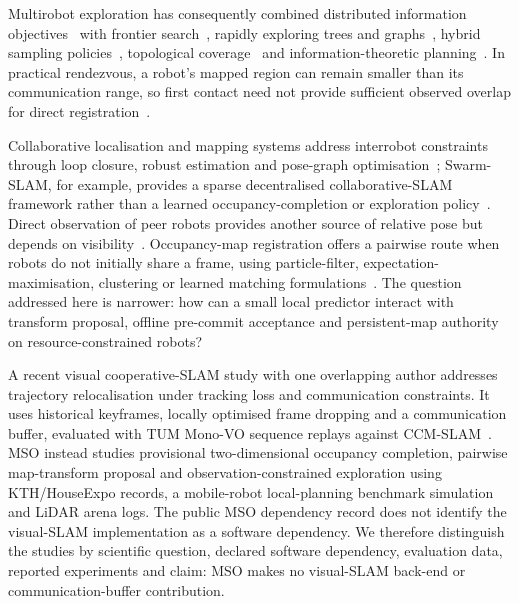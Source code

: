 \documentclass[11pt]{article}
\begin{document}
Multirobot exploration has consequently combined distributed information objectives~\citep{mu2016information,wang2025multi} with frontier search~\citep{holz2010evaluating,dornhege2013frontier}, rapidly exploring trees and graphs~\citep{lavalle1998rapidly,karaman2011sampling}, hybrid sampling policies~\citep{selin2019efficient,respall2021fast}, topological coverage~\citep{choset2000sensor,acar2002sensor} and information-theoretic planning~\citep{bourgault2002information,stachniss2005information}. In practical rendezvous, a robot's mapped region can remain smaller than its communication range, so first contact need not provide sufficient observed overlap for direct registration~\citep{zhou2006multi,thrun2005multi,birk2006merging,stathoulopoulos2023frame}.

Collaborative localisation and mapping systems address interrobot constraints through loop closure, robust estimation and pose-graph optimisation~\citep{lajoie2020door,schmuck2019ccm,lajoie2024swarm}; Swarm-SLAM, for example, provides a sparse decentralised collaborative-SLAM framework rather than a learned occupancy-completion or exploration policy~\citep{lajoie2024swarm}. Direct observation of peer robots provides another source of relative pose but depends on visibility~\citep{wang2024transformloc,zhu2024swarm,zhou2022swarm}. Occupancy-map registration offers a pairwise route when robots do not initially share a frame, using particle-filter, expectation-maximisation, clustering or learned matching formulations~\citep{carlone2011simultaneous,huang2024multi,dong2015distributed,saeedi2011multiple,saeedi2011neural}. The question addressed here is narrower: how can a small local predictor interact with transform proposal, offline pre-commit acceptance and persistent-map authority on resource-constrained robots?

A recent visual cooperative-SLAM study with one overlapping author addresses trajectory relocalisation under tracking loss and communication constraints. It uses historical keyframes, locally optimised frame dropping and a communication buffer, evaluated with TUM Mono-VO sequence replays against CCM-SLAM~\citep{chen2026accurate}. MSO instead studies provisional two-dimensional occupancy completion, pairwise map-transform proposal and observation-constrained exploration using KTH/HouseExpo records, a mobile-robot local-planning benchmark simulation and LiDAR arena logs. The public MSO dependency record does not identify the visual-SLAM implementation as a software dependency. We therefore distinguish the studies by scientific question, declared software dependency, evaluation data, reported experiments and claim: MSO makes no visual-SLAM back-end or communication-buffer contribution.
\end{document}
